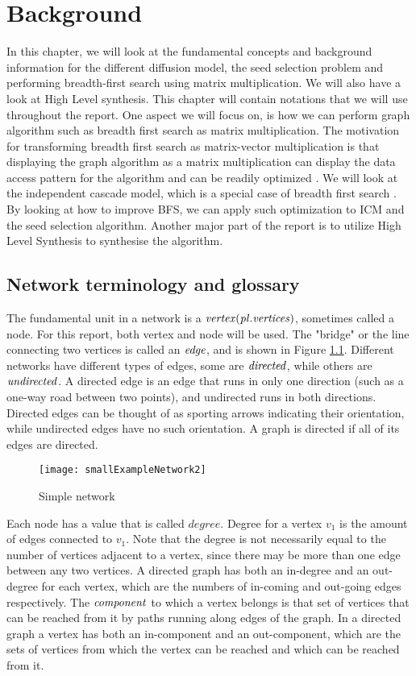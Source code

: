 \chapter{Background} \label{background}

In this chapter, we will look at the fundamental concepts and background information for the different diffusion model, the seed selection problem and performing breadth-first search using matrix multiplication. We will also have a look at High Level synthesis. This chapter will contain notations that we will use throughout the report. One aspect we will focus on, is how we can perform graph algorithm such as breadth first search as matrix multiplication. The motivation for transforming breadth first search as matrix-vector multiplication is that displaying the graph algorithm as a matrix multiplication can display the data access pattern for the algorithm and can be readily optimized  \cite{AlgoToMath}. We will look at the independent cascade model, which is a special case of breadth first search  \cite{HybridBFS2015}. By looking at how to improve BFS, we can apply such optimization to ICM and the seed selection algorithm. Another major part of the report is to utilize High Level Synthesis to synthesise the algorithm. 


\section{Network terminology and glossary}
The fundamental unit in a network is a $\it{{vertex}} (pl. vertices)$, sometimes called a node. For this report, both vertex and node will be used. The "bridge" or the line connecting two vertices is called an $\it{{edge}}$, and is shown in Figure \ref{fig:SimpleGraph}.  Different networks have different types of edges, some are $\it{directed}$, while others are $\it {undirected}$. A directed edge is an edge that runs in only one direction (such as a one-way road between two points), and undirected runs in both directions. Directed edges can be thought of as sporting arrows indicating their orientation, while undirected edges have no such orientation. A graph is directed if all of its edges are directed.

\begin{figure}[!ht]
	\texttt{[image: smallExampleNetwork2]}
	\caption{Simple network} 
	\label{fig:SimpleGraph}
\end{figure}


Each node has a value that is called $\textit{{degree}}$. Degree for a vertex $v_1$ is the amount of edges connected to $v_1$. Note that the degree is not necessarily equal to the number of vertices adjacent to a vertex, since there may be more than one edge between any two vertices. A directed graph has both an in-degree and an out-degree for each vertex, which are the numbers of in-coming and out-going edges respectively. The $\it{{component}}$ to which a vertex belongs is that set of vertices that can be reached from it by paths running along edges of the graph. In a directed graph a vertex has both an in-component and an out-component, which are the sets of vertices from which the vertex can be reached and which can be reached from it.

